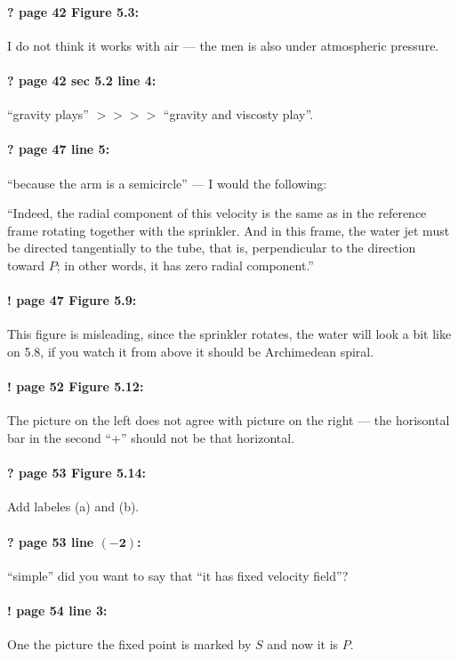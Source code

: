 \documentclass[twoside]{article}
\begin{document}
\paragraph{? page 42 Figure 5.3:} I do not think it works with air --- the men is also under atmospheric pressure.

\paragraph{? page 42 sec 5.2 line 4:} ``gravity plays'' $>\!>\!>\!>$ ``gravity and viscosty play''.

\paragraph{? page 47 line 5:} ``because the arm is a semicircle'' --- I would the following:

``Indeed, the radial component of this velocity is the same as in the reference frame rotating together with the sprinkler.
And in this frame, the water jet must be directed tangentially to the tube, that is, perpendicular to the direction toward $P$; in other words, it has zero radial component.''

\paragraph{! page 47 Figure 5.9:} This figure is misleading, since the sprinkler rotates, the water will look a bit like on 5.8, if you watch it from above it should be Archimedean spiral.

\paragraph{! page 52 Figure 5.12:} The picture on the left does not agree with picture on the right --- the horisontal bar in the second ``+'' should not be that horizontal.

\paragraph{? page 53 Figure 5.14:} Add labeles (a) and (b).

\paragraph{? page 53 line $\bm{(-2)}$:} ``simple'' did you want to say that ``it has fixed velocity field''?

\paragraph{! page 54 line 3:} One the picture the fixed point is marked by $S$ and now it is $P$.
\end{document}
